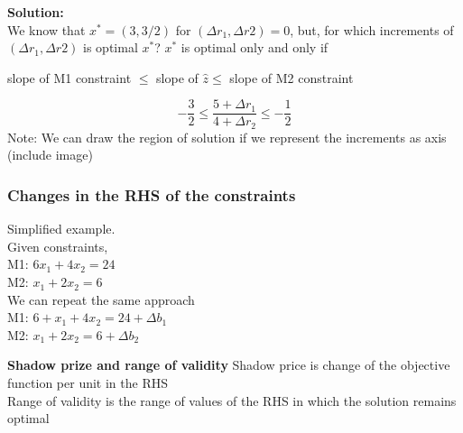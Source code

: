 \textbf{Solution:}\\
We know that $x^* = (3, 3/2)$ for $(\Delta r_1, \Delta r2) = 0$, but, for which increments of $(\Delta r_1, \Delta r2)$ is optimal $x^*$?
$x^*$ is optimal only and only if
\begin{center}
    slope of M1 constraint $\leq$ slope of $\hat{z} \leq$ slope of M2 constraint
\end{center} 
\[ -\frac{3}{2} \leq \frac{5 + \Delta r_1}{4 + \Delta r_2} \leq -\frac{1}{2} \]
Note: We can draw the region of solution if we represent the increments as axis (include image)

\subsubsection{Changes in the RHS of the constraints}
Simplified example.\\
Given constraints,\\
M1: $ 6x_1 + 4x_2 = 24 $ \\
M2: $ x_1 + 2x_2 = 6 $\\
We can repeat the same approach\\
M1: $ 6+x_1 + 4x_2 = 24 + \Delta b_1 $\\
M2: $ x_1 + 2x_2 = 6 + \Delta b_2 $

\textbf{Shadow prize and range of validity}
Shadow price is change of the objective function per unit in the RHS\\
Range of validity is the range of values of the RHS in which the solution remains optimal
